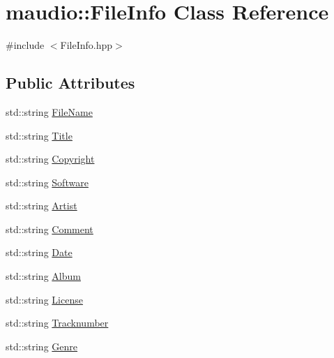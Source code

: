 \hypertarget{classmaudio_1_1FileInfo}{\section{maudio\-:\-:File\-Info Class Reference}
\label{classmaudio_1_1FileInfo}
}


{\ttfamily \#include $<$File\-Info.\-hpp$>$}

\subsection*{Public Attributes}
\begin{DoxyCompactItemize}
\item 
std\-::string \hyperlink{classmaudio_1_1FileInfo_af6ae1285091042123f8a085e8409519a}{File\-Name}
\item 
std\-::string \hyperlink{classmaudio_1_1FileInfo_a75de1fe16dda2fa2b740e5840befa136}{Title}
\item 
std\-::string \hyperlink{classmaudio_1_1FileInfo_a14deaeaf7ce3f6199df91949f9b203fa}{Copyright}
\item 
std\-::string \hyperlink{classmaudio_1_1FileInfo_afcac65260e528fdcfd9edcc03546e050}{Software}
\item 
std\-::string \hyperlink{classmaudio_1_1FileInfo_ac7d8160fd99886cf9965320a6205f8a2}{Artist}
\item 
std\-::string \hyperlink{classmaudio_1_1FileInfo_a261b363a280a559f2798cdd4c68c61b2}{Comment}
\item 
std\-::string \hyperlink{classmaudio_1_1FileInfo_a5e87a7861359ae6561feb6dedd44706f}{Date}
\item 
std\-::string \hyperlink{classmaudio_1_1FileInfo_a7401b31fcb454d8643a52df46f952462}{Album}
\item 
std\-::string \hyperlink{classmaudio_1_1FileInfo_a66338e82866dc97e0e1f4de4b17dd376}{License}
\item 
std\-::string \hyperlink{classmaudio_1_1FileInfo_ad3861dc761b16bf86695827542b4d02d}{Tracknumber}
\item 
std\-::string \hyperlink{classmaudio_1_1FileInfo_a719ece71b50358f453939384bbeced83}{Genre}
\end{DoxyCompactItemize}


